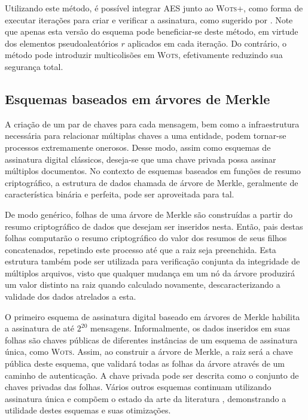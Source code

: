 \documentclass[12pt]{report}
\begin{document}
Utilizando este método, é possível integrar AES junto ao \textsc{Wots+}, como forma de executar iterações para criar e verificar a assinatura, como sugerido por \cite[4.1]{cryptoeprint:2017:965}. Note que apenas esta versão do esquema pode beneficiar-se deste método, em virtude dos elementos pseudoaleatórios $r$ aplicados em cada iteração. Do contrário, o método pode introduzir multicolisões em \textsc{Wots}, efetivamente reduzindo sua segurança total. %

\subsection{Esquemas baseados em árvores de Merkle}

A criação de um par de chaves para cada mensagem, bem como a infraestrutura necessária para relacionar múltiplas chaves a uma entidade, podem tornar-se processos extremamente onerosos. Desse modo, assim como esquemas de assinatura digital clássicos, deseja-se que uma chave privada possa assinar múltiplos documentos. No contexto de esquemas baseados em funções de resumo criptográfico, a estrutura de dados chamada de árvore de Merkle, geralmente de característica binária e perfeita, pode ser aproveitada para tal.

De modo genérico, folhas de uma árvore de Merkle são construídas a partir do resumo criptográfico de dados que desejam ser inseridos nesta. Então, pais destas folhas computarão o resumo criptográfico do valor dos resumos de seus filhos concatenados, repetindo este processo até que a raiz seja preenchida. Esta estrutura também pode ser utilizada para verificação conjunta da integridade de múltiplos arquivos, visto que qualquer mudança em um nó da árvore produzirá um valor distinto na raiz quando calculado novamente, descaracterizando a validade dos dados atrelados a esta.

O primeiro esquema de assinatura digital baseado em árvores de Merkle \cite{Merkle:1989:CDS:118209.118230} habilita a assinatura de até $2^{20}$ mensagens. Informalmente, os dados inseridos em suas folhas são chaves públicas de diferentes instâncias de um esquema de assinatura única, como \textsc{Wots}. Assim, ao construir a árvore de Merkle, a raiz será a chave pública deste esquema, que validará todas as folhas da árvore através de um caminho de autenticação. A chave privada pode ser descrita como o conjunto de chaves privadas das folhas. Vários outros esquemas continuam utilizando assinatura única e compõem o estado da arte da literatura \cite{sphincsplus,irtf-cfrg-xmss-hash-based-signatures-12}, demonstrando a utilidade destes esquemas e suas otimizações.
\end{document}
